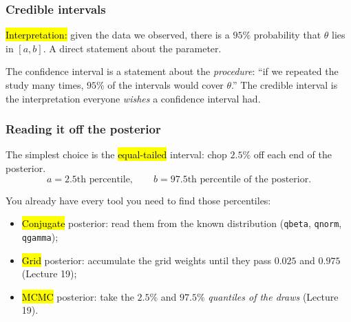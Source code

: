 \documentclass[slidestop,compress,mathserif]{beamer}
\begin{document}
\begin{frame}
\frametitle{Credible intervals}


\pause
\medskip

\hl{Interpretation:} given the data we observed, there is a $95\%$ probability that $\theta$ lies in $[a,b]$. A direct statement about the parameter.

\pause
\medskip


\pause
\medskip

The confidence interval is a statement about the \emph{procedure}: ``if we repeated the study many times, $95\%$ of the intervals would cover $\theta$.'' The credible interval is the interpretation everyone \emph{wishes} a confidence interval had.
\end{frame}

\begin{frame}
\frametitle{Reading it off the posterior}

The simplest choice is the \hl{equal-tailed} interval: chop $2.5\%$ off each end of the posterior.
\[
a = \text{2.5th percentile}, \qquad b = \text{97.5th percentile of the posterior}.
\]
\pause
\medskip

You already have every tool you need to find those percentiles:
\begin{itemize}
    \item \hl{Conjugate} posterior: read them from the known distribution (\texttt{qbeta}, \texttt{qnorm}, \texttt{qgamma});
    \item \hl{Grid} posterior: accumulate the grid weights until they pass $0.025$ and $0.975$ (Lecture 19);
    \item \hl{MCMC} posterior: take the $2.5\%$ and $97.5\%$ \emph{quantiles of the draws} (Lecture 19).
\end{itemize}
\end{frame}
\end{document}
